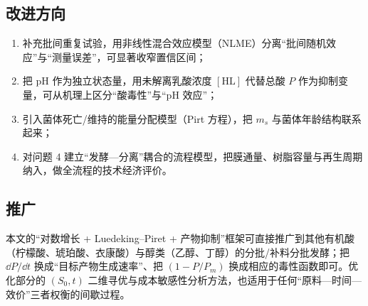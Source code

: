 \subsection{改进方向}
\begin{enumerate}[leftmargin=2.2em,itemsep=0.10em]
\item 补充批间重复试验，用非线性混合效应模型（NLME）分离“批间随机效应”与“测量误差”，可显著收窄置信区间；
\item 把 pH 作为独立状态量，用未解离乳酸浓度 $[\mathrm{HL}]$ 代替总酸 $P$ 作为抑制变量，可从机理上区分“酸毒性”与“pH 效应”；
\item 引入菌体死亡/维持的能量分配模型（Pirt 方程），把 $m_s$ 与菌体年龄结构联系起来；
\item 对问题 4 建立“发酵—分离”耦合的流程模型，把膜通量、树脂容量与再生周期纳入，做全流程的技术经济评价。
\end{enumerate}

\subsection{推广}
本文的“对数增长 + Luedeking--Piret + 产物抑制”框架可直接推广到其他有机酸（柠檬酸、琥珀酸、衣康酸）与醇类（乙醇、丁醇）的分批/补料分批发酵；把 $\dd P/\dd t$ 换成“目标产物生成速率”、把 $(1-P/P_m)$ 换成相应的毒性函数即可。优化部分的 $(S_0,t)$ 二维寻优与成本敏感性分析方法，也适用于任何“原料—时间—效价”三者权衡的间歇过程。

